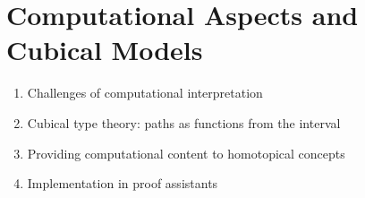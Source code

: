 \section{Computational Aspects and Cubical Models}\label{sec:comp}

\begin{enumerate}
    \item Challenges of computational interpretation
    \item Cubical type theory: paths as functions from the interval
    \item Providing computational content to homotopical concepts
    \item Implementation in proof assistants
\end{enumerate}

